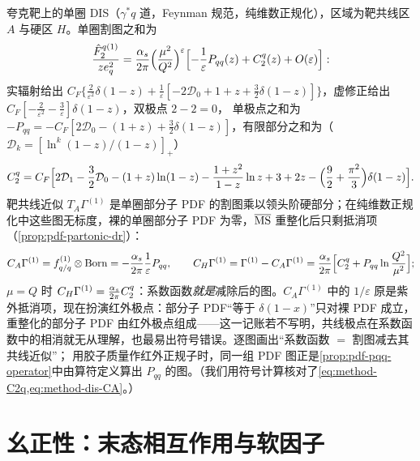 \begin{example}\label{ex:method-dis-oneloop}
夸克靶上的单圈 DIS（$\gamma^*q$ 道，Feynman 规范，纯维数正规化），区域为靶共线区 $A$ 与硬区 $H$。单圈割图之和为
\begin{equation}\label{eq:method-dis-gamma1}
\frac{\hat F_2^{q(1)}}{ze_q^2}=\frac{\alpha_s}{2\pi}\Bigl(\frac{\mu^2}{Q^2}\Bigr)^{\varepsilon}\Bigl[-\frac1\varepsilon P_{qq}(z)+C_2^q(z)+O(\varepsilon)\Bigr] :
\end{equation}
实辐射给出 $C_F\{\frac2{\varepsilon^2}\delta(1-z)+\frac1\varepsilon[-2\mathcal D_0+1+z+\frac32\delta(1-z)]\}$，虚修正给出 $C_F[-\frac2{\varepsilon^2}-\frac3\varepsilon]\delta(1-z)$，双极点 $2-2=0$，
单极点之和为 $-P_{qq}=-C_F[2\mathcal D_0-(1+z)+\frac32\delta(1-z)]$，有限部分之和为（$\mathcal D_k=[\ln^k(1-z)/(1-z)]_+$）
\begin{equation}\label{eq:method-C2q}
C_2^q=C_F\Bigl[2\mathcal D_1-\frac32\mathcal D_0-(1+z)\ln(1-z)-\frac{1+z^2}{1-z}\ln z+3+2z-\Bigl(\frac92+\frac{\pi^2}3\Bigr)\delta(1-z)\Bigr] .
\end{equation}
靶共线近似 $T_A\Gamma^{(1)}$ 是单圈部分子 PDF 的割图乘以领头阶硬部分；在纯维数正规化中这些图无标度，裸的单圈部分子 PDF 为零，$\overline{\rm MS}$ 重整化后只剩抵消项（\cref{prop:pdf-partonic-dr}）：
\begin{equation}\label{eq:method-dis-CA}
C_A\Gamma^{(1)}=f^{(1)}_{q/q}\otimes{\rm Born}=-\frac{\alpha_s}{2\pi}\frac1\varepsilon P_{qq},\qquad
C_H\Gamma^{(1)}=\Gamma^{(1)}-C_A\Gamma^{(1)}=\frac{\alpha_s}{2\pi}\Bigl[C_2^q+P_{qq}\ln\frac{Q^2}{\mu^2}\Bigr] ;
\end{equation}
$\mu=Q$ 时 $C_H\Gamma^{(1)}=\frac{\alpha_s}{2\pi}C_2^q$：系数函数\emph{就是}减除后的图。$C_A\Gamma^{(1)}$ 中的 $1/\varepsilon$ 原是紫外抵消项，现在扮演红外极点：部分子 PDF“等于 $\delta(1-x)$”只对裸 PDF 成立，
重整化的部分子 PDF 由红外极点组成——这一记账若不写明，共线极点在系数函数中的相消就无从理解，也最易出符号错误。逐图画出“系数函数 $=$ 割图减去其共线近似”；
用胶子质量作红外正规子时，同一组 PDF 图正是\cref{prop:pdf-pqq-operator}中由算符定义算出 $P_{qq}$ 的图。（我们用符号计算核对了\cref{eq:method-C2q,eq:method-dis-CA}。）%
\end{example}

\section{幺正性：末态相互作用与软因子}\label{sec:method-unitarity}

